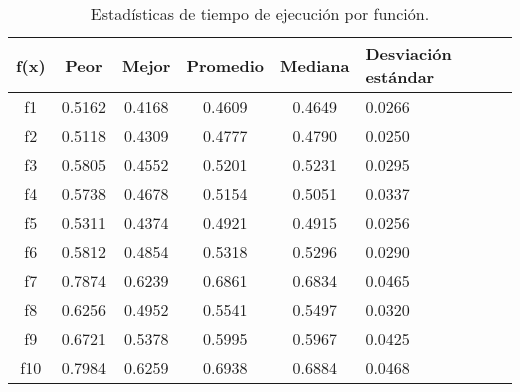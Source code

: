 \begin{table}[h]
	\centering
	\begin{tabular}{|c|c|c|c|c|p{2.1cm}|}  
		\hline
		\textbf{f(x)} & \textbf{Peor} & \textbf{Mejor} & \textbf{Promedio} & \textbf{Mediana} & \textbf{Desviación estándar} \\  
		\hline
		f1  & 0.5162 & 0.4168 & 0.4609 & 0.4649 & 0.0266 \\
		f2  & 0.5118 & 0.4309 & 0.4777 & 0.4790 & 0.0250 \\
		f3  & 0.5805 & 0.4552 & 0.5201 & 0.5231 & 0.0295 \\
		f4  & 0.5738 & 0.4678 & 0.5154 & 0.5051 & 0.0337 \\
		f5  & 0.5311 & 0.4374 & 0.4921 & 0.4915 & 0.0256 \\
		f6  & 0.5812 & 0.4854 & 0.5318 & 0.5296 & 0.0290 \\
		f7  & 0.7874 & 0.6239 & 0.6861 & 0.6834 & 0.0465 \\
		f8  & 0.6256 & 0.4952 & 0.5541 & 0.5497 & 0.0320 \\
		f9  & 0.6721 & 0.5378 & 0.5995 & 0.5967 & 0.0425 \\
		f10 & 0.7984 & 0.6259 & 0.6938 & 0.6884 & 0.0468 \\
		\hline
	\end{tabular}
	\caption{Estadísticas de tiempo de ejecución por función.}
	\label{tab:tiempo}
\end{table}
